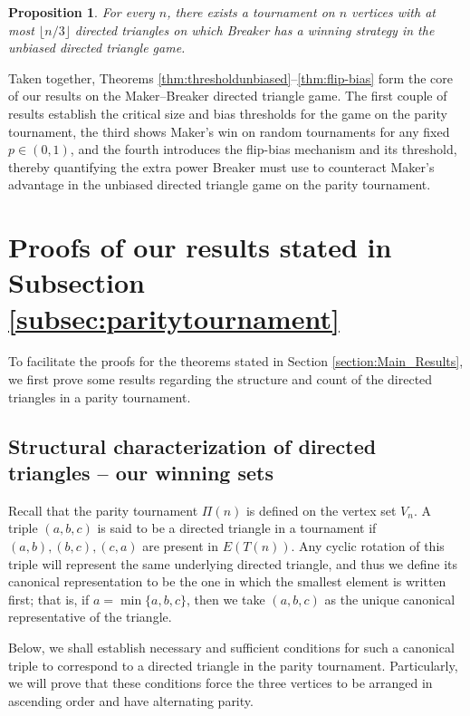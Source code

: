 \documentclass{article}
\theoremstyle{definition}
\theoremstyle{plain}
\newtheorem{prop}[theo]{Proposition}
\theoremstyle{remark}
\theoremstyle{definition}
\begin{document}
\begin{prop}\label{prop:linear-triangles-breakerwin}
    For every $n$, there exists a tournament on $n$ vertices with at most $\lfloor n/3\rfloor$ directed triangles on which Breaker has a winning strategy in the unbiased directed triangle game.
\end{prop}

Taken together, Theorems \ref{thm:thresholdunbiased}–\ref{thm:flip-bias} form the core of our results on the Maker–Breaker directed triangle game. The first couple of results establish the critical size and bias thresholds for the game on the parity tournament, the third shows Maker's win on random tournaments for any fixed $p\in(0,1)$, and the fourth introduces the flip-bias mechanism and its threshold, thereby quantifying the extra power Breaker must use to counteract Maker's advantage in the unbiased directed triangle game on the parity tournament. 

\section{Proofs of our results stated in Subsection \ref{subsec:paritytournament}}\label{sec: proofs1}

To facilitate the proofs for the theorems stated in Section \ref{section:Main_Results}, we first prove some results regarding the structure and count of the directed triangles in a parity tournament. 

\subsection{Structural characterization of directed triangles -- our winning sets}\label{subsec:structuralcharacterization}

Recall that the parity tournament $\Pi(n)$ is defined on the vertex set $V_n$. A triple $(a,b,c)$ is said to be a directed triangle in a tournament if $(a,b), (b,c),(c,a)$ are present in $E(T(n))$. Any cyclic rotation of this triple will represent the same underlying directed triangle, and thus we define its canonical representation to be the one in which the smallest element is written first; that is, if $a = \min\{a,b,c\}$, then we take $(a,b,c)$ as the unique canonical representative of the triangle.

Below, we shall establish necessary and sufficient conditions for such a canonical triple to correspond to a directed triangle in the parity tournament. Particularly, we will prove that these conditions force the three vertices to be arranged in ascending order and have alternating parity.
\end{document}
